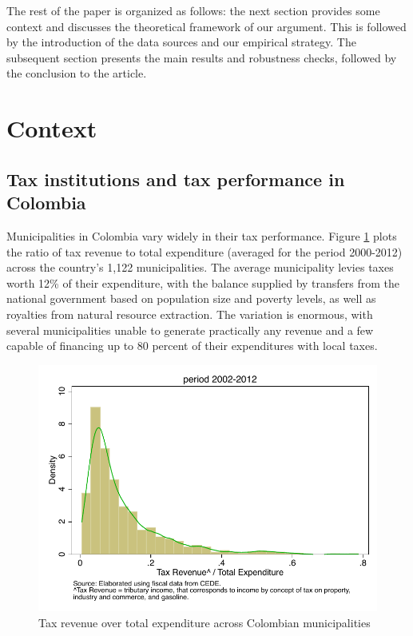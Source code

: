 The rest of the paper is organized as follows: the next section provides some context and discusses the theoretical framework of our argument. This is followed by the introduction of the data sources and our empirical strategy. The subsequent section presents the main results and robustness checks, followed by the conclusion to the article.

\section{Context}

\subsection{Tax institutions and tax performance in Colombia}

Municipalities in Colombia vary widely in their tax performance. Figure \ref{chapter3_fig:taxrevenues} plots the ratio of tax revenue to total expenditure (averaged for the period 2000-2012) across the country's 1,122 municipalities. The average municipality levies taxes worth 12\% 
of their expenditure, with the balance supplied by transfers from the national government based on population size and poverty levels, as well as royalties from natural resource extraction. The variation is enormous, with several municipalities unable to generate practically any revenue and a few capable of financing up to 80 percent of their expenditures with local taxes. 

\begin{figure}[H]
\begin{center}
\caption{Tax revenue over total expenditure across Colombian municipalities}
\label{chapter3_fig:taxrevenues}
\includegraphics[width=1\textwidth]{Chapter3/Figures/figure1.pdf}
\end{center}
\end{figure}

